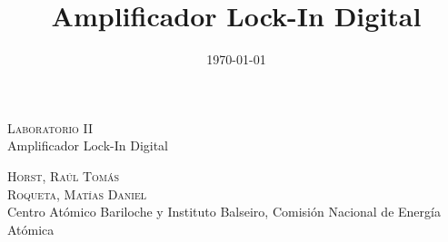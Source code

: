 \documentclass[11pt,a4paper]{extarticle}
\date{\small{\today}}
\begin{document}
\title{Amplificador Lock-In Digital}
	\LARGE{\textsc{Laboratorio II}}\\
	\Large{Amplificador Lock-In Digital}\\
\begin{large}
\small\textsc{Horst, Raúl Tomás}\\
\small\textsc{Roqueta, Matías Daniel}\\
\small{Centro Atómico Bariloche y Instituto Balseiro, Comisión Nacional de Energía Atómica}\\
\end{large}
\setcounter{page}{1}

\chead{}

\rfoot{\thepage} 
\renewcommand{\headrulewidth}{0.4pt} 
\renewcommand{\footrulewidth}{0.4pt} 
\pagestyle{fancy}
\end{document}
